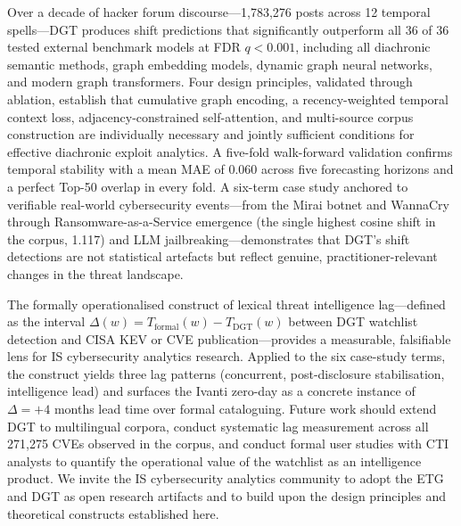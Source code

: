 \documentclass[12pt]{article}
\begin{document}
Over a decade of hacker forum discourse---1,783,276 posts across 12 temporal spells---DGT produces shift predictions that significantly outperform all 36 of 36 tested external benchmark models at FDR $q < 0.001$, including all diachronic semantic methods, graph embedding models, dynamic graph neural networks, and modern graph transformers. Four design principles, validated through ablation, establish that cumulative graph encoding, a recency-weighted temporal context loss, adjacency-constrained self-attention, and multi-source corpus construction are individually necessary and jointly sufficient conditions for effective diachronic exploit analytics. A five-fold walk-forward validation confirms temporal stability with a mean MAE of 0.060 across five forecasting horizons and a perfect Top-50 overlap in every fold. A six-term case study anchored to verifiable real-world cybersecurity events---from the Mirai botnet and WannaCry through Ransomware-as-a-Service emergence (the single highest cosine shift in the corpus, 1.117) and LLM jailbreaking---demonstrates that DGT's shift detections are not statistical artefacts but reflect genuine, practitioner-relevant changes in the threat landscape.

The formally operationalised construct of lexical threat intelligence lag---defined as the interval $\Delta(w) = T_{\mathrm{formal}}(w) - T_{\mathrm{DGT}}(w)$ between DGT watchlist detection and CISA KEV or CVE publication---provides a measurable, falsifiable lens for IS cybersecurity analytics research. Applied to the six case-study terms, the construct yields three lag patterns (concurrent, post-disclosure stabilisation, intelligence lead) and surfaces the Ivanti zero-day as a concrete instance of $\Delta = +4$ months lead time over formal cataloguing. Future work should extend DGT to multilingual corpora, conduct systematic lag measurement across all 271,275 CVEs observed in the corpus, and conduct formal user studies with CTI analysts to quantify the operational value of the watchlist as an intelligence product. We invite the IS cybersecurity analytics community to adopt the ETG and DGT as open research artifacts and to build upon the design principles and theoretical constructs established here.

\newpage
\singlespacing
\printbibliography

\newpage
{}
\justifying
\bodyfont
\end{document}
